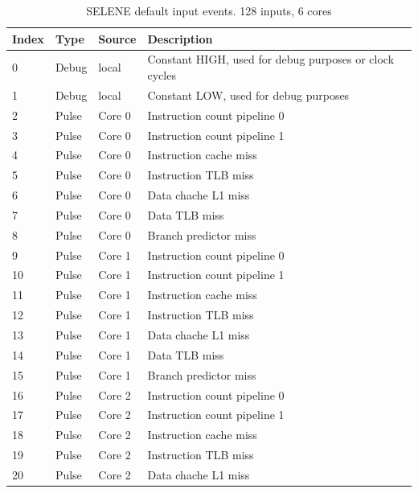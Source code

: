 \begin{table}[H]
	\caption{SELENE default input events. 128 inputs, 6 cores}
	\label{table:t_ev2}
	\centering
	\begin{tiny}
		\begin{tabular}{|l|l|l|l|l|}
			\hline
			\textbf{Index} & \textbf{Type}  & \textbf{Source} & \textbf{Description}\\
			\hline
			0 & Debug & local &  Constant HIGH, used for debug purposes or clock cycles \\
			\hline 
			1 & Debug & local &  Constant LOW, used for debug purposes \\
			\hline 
			2 & Pulse & Core 0 &  Instruction count pipeline 0 \\
			\hline 
			3 & Pulse & Core 0 &  Instruction count pipeline 1 \\
			\hline 
			4 & Pulse & Core 0 &  Instruction cache miss \\
			\hline 
			5 & Pulse & Core 0 &  Instruction TLB miss \\
			\hline 
			6 & Pulse & Core 0 &  Data chache L1 miss \\
			\hline 
			7 & Pulse & Core 0 &  Data TLB miss \\
			\hline 
			8 & Pulse & Core 0 &  Branch predictor miss \\
			\hline 
			9 & Pulse & Core 1 &  Instruction count pipeline 0 \\
			\hline 
			10 & Pulse & Core 1 &  Instruction count pipeline 1 \\
			\hline 
			11 & Pulse & Core 1 &  Instruction cache miss \\
			\hline 
			12 & Pulse & Core 1 &  Instruction TLB miss \\
			\hline 
			13 & Pulse & Core 1 &  Data chache L1 miss \\
			\hline 
			14 & Pulse & Core 1 &  Data TLB miss \\
			\hline 
			15 & Pulse & Core 1 &  Branch predictor miss \\
			\hline 
			16 & Pulse & Core 2 &  Instruction count pipeline 0 \\
			\hline 
			17 & Pulse & Core 2 &  Instruction count pipeline 1 \\
			\hline 
			18 & Pulse & Core 2 &  Instruction cache miss \\
			\hline 
			19 & Pulse & Core 2 &  Instruction TLB miss \\
			\hline 
			20 & Pulse & Core 2 &  Data chache L1 miss \\

\end{tabular}
\end{tiny}
\end{table}
